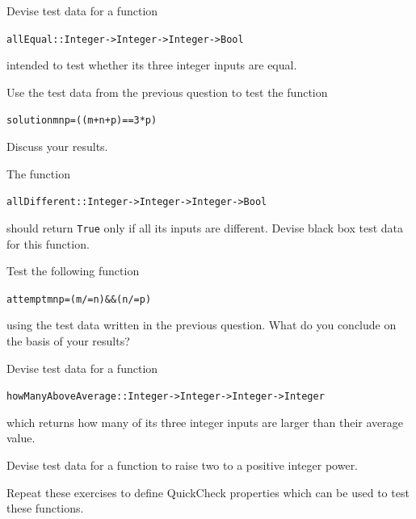 \begin{exercises}

\item
Devise test data for a function
\begin{alltt}
allEqual :: Integer -> Integer -> Integer -> Bool
\end{alltt}
intended to test whether its three integer inputs are equal.

\item
Use the test data from the previous question to test the function
\begin{alltt}
solution m n p = ((m+n+p)==3*p)
\end{alltt}
Discuss your results.

\item
The function 
\begin{alltt}
allDifferent :: Integer -> Integer -> Integer -> Bool
\end{alltt}
should return \texttt{True} only if all its inputs are different. Devise
black box test data for this function.

\item
Test the following function
\begin{alltt}
attempt m n p = (m/=n) \&\& (n/=p)
\end{alltt}
using the test data written in the previous question. What do you
conclude on the basis of your results?

\item
Devise test data for a function
\begin{alltt}
howManyAboveAverage :: Integer -> Integer -> Integer -> Integer
\end{alltt}
which returns how many of its three integer inputs are larger than their
average value.

\item
Devise test data for a function to raise two to a positive integer
power.

\item
Repeat these exercises to define QuickCheck properties which can be used to test these functions.
\end{exercises}


